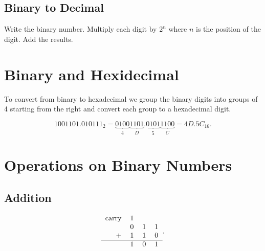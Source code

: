\documentclass{report}
\begin{document}

\subsection{Binary to Decimal}

\begin{enumerate}
	\ii Write the binary number.
	\ii Multiply each digit by $2^n$ where $n$ is the position of the digit.
	\ii Add the results.
\end{enumerate}



\section{Binary and Hexidecimal}

To convert from binary to hexadecimal we group the binary digits into groups of 4 starting from the right and convert each group to a hexadecimal digit.

\[
	1001101.010111_2 = \underbrace{0100}_{4} \underbrace{1101}_{D} . \underbrace{0101}_{5} \underbrace{1100}_{C} = 4D.5C_{16}
	.\]

\section{Operations on Binary Numbers}

\subsection{Addition}

\[
	\arraycolsep=1.4pt
	\begin{tabular}{r c c c}
		\text{carry} & 1 &   &   \\
		             & 0 & 1 & 1 \\
		+            & 1 & 1 & 0 \\
		\hline
		             & 1 & 0 & 1 \\
	\end{tabular}
	.\]
\end{document}
